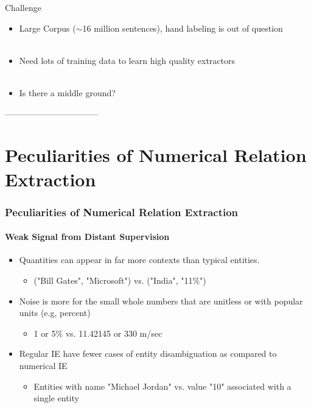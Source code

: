\documentclass{beamer}
\begin{document}
\begin{frame}{Challenge}
 \begin{itemize}
  \item Large Corpus ($\sim$16 million sentences), hand labeling is out of question \pause \\~\\
  \item Need lots of training data to learn high quality extractors \pause \\~\\
  \item Is there a middle ground?
 \end{itemize}
\end{frame}
---------------------------------


\section{Peculiarities of Numerical Relation Extraction}
\begin{frame}
\frametitle{Peculiarities of Numerical Relation Extraction}
\framesubtitle{Weak Signal from Distant Supervision}

\begin{itemize}

\item Quantities can appear in far more contexts than typical entities. \pause
	\begin{itemize}
    	\item ("Bill Gates", "Microsoft") vs. ("India", "11\%") \pause
    \end{itemize}
 \item Noise is more for the small whole numbers that are unit\-less or with popular units (e.g, percent) \pause
 	\begin{itemize}
    	\item 1 or 5\% vs. 11.42145 or 330 m/sec \pause
    \end{itemize}
 \item Regular IE have fewer cases of entity disambiguation as compared to numerical IE \pause
 	\begin{itemize}
    	\item Entities with name "Michael Jordan" vs. value "10" associated with a single entity 
    \end{itemize}
\end{itemize}

\end{frame}
\end{document}
